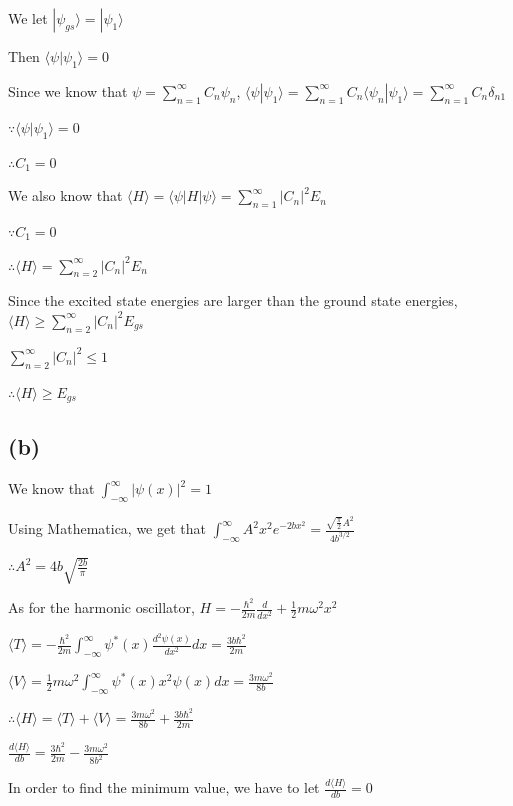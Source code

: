 \documentclass[12pt]{article}
\begin{document}
\begin{spacing}{2.0}
We let $|\psi_{gs}\rangle = |\psi_1 \rangle$

Then $\langle \psi|\psi_1 \rangle = 0$

Since we know that $\psi= \sum\limits_{n=1}^{\infty} C_n \psi_n$, $\langle \psi| \psi_1 \rangle= \sum\limits_{n=1}^{\infty} C_n \langle \psi_n | \psi_1 \rangle = \sum\limits_{n=1}^{\infty} C_n \delta_{n1}$

$\because \langle \psi|\psi_1 \rangle = 0$

$\therefore C_1=0$

We also know that $\langle H \rangle = \langle \psi|H|\psi \rangle = \sum\limits_{n=1}^{\infty} |C_n|^2 E_n$

$\because C_1=0$

$\therefore \langle H \rangle= \sum\limits_{n=2}^{\infty} |C_n|^2 E_n$

Since the excited state energies are larger than the ground state energies, $\langle H \rangle \ge \sum\limits_{n=2}^{\infty} |C_n|^2 E_{gs}$

$\sum\limits_{n=2}^{\infty} |C_n|^2 \le 1$

$\therefore \langle H \rangle \ge E_{gs}$

\subsection*{(b)}

We know that $\int_{-\infty}^{\infty} |\psi(x)|^2 =1$

Using Mathematica, we get that $\int_{-\infty}^{\infty} A^2x^2e^{-2bx^2} = \frac{\sqrt{\frac{\pi }{2}} A^2}{4 b^{3/2}}$

$\therefore A^2= 4b\sqrt{\frac{2b}{\pi}}$

As for the harmonic oscillator, $H= -\frac{\hbar^2}{2m} \frac{d}{dx^2}+ \frac{1}{2} m\omega^2 x^2$

$\langle T \rangle = -\frac{\hbar^2}{2m} \int_{-\infty}^{\infty} \psi^{*}(x) \frac{d^2\psi(x)}{dx^2} dx = \frac{3 b \hbar ^2}{2 m}$

$\langle V \rangle= \frac{1}{2}m\omega^2 \int_{-\infty}^{\infty} \psi^{*}(x)x^2\psi(x) dx = \frac{3 m \omega ^2}{8 b}$

$\therefore \langle H \rangle = \langle T \rangle + \langle V \rangle= \frac{3 m \omega ^2}{8 b}+\frac{3 b \hbar ^2}{2 m}$

$\frac{d\langle H \rangle}{db}= \frac{3 \hbar ^2}{2 m}-\frac{3 m \omega ^2}{8 b^2}$

In order to find the minimum value, we have to let $\frac{d\langle H \rangle}{db}= 0 $


\end{spacing}
\end{document}
